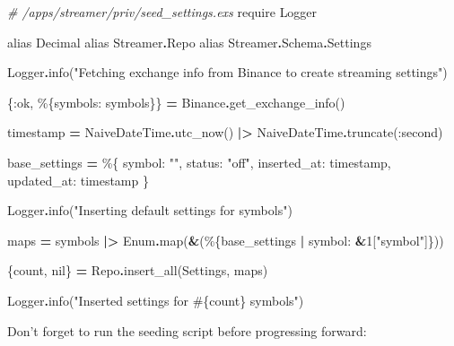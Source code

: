 \documentclass[
  oneside]{book}
\newenvironment{Shaded}{\begin{snugshade}}{\end{snugshade}}
\newcommand{\CommentTok}[1]{\textcolor[rgb]{0.56,0.35,0.01}{\textit{#1}}}
\newcommand{\ConstantTok}[1]{\textcolor[rgb]{0.00,0.00,0.00}{#1}}
\newcommand{\DecValTok}[1]{\textcolor[rgb]{0.00,0.00,0.81}{#1}}
\newcommand{\ImportTok}[1]{#1}
\newcommand{\NormalTok}[1]{#1}
\newcommand{\OperatorTok}[1]{\textcolor[rgb]{0.81,0.36,0.00}{\textbf{#1}}}
\newcommand{\OtherTok}[1]{\textcolor[rgb]{0.56,0.35,0.01}{#1}}
\newcommand{\StringTok}[1]{\textcolor[rgb]{0.31,0.60,0.02}{#1}}
\newcommand{\VariableTok}[1]{\textcolor[rgb]{0.00,0.00,0.00}{#1}}
\begin{document}
\begin{Shaded}
\begin{Highlighting}[]
\CommentTok{\# /apps/streamer/priv/seed\_settings.exs}
\ImportTok{require} \ConstantTok{Logger}

\ImportTok{alias} \ConstantTok{Decimal}
\ImportTok{alias} \ConstantTok{Streamer}\OperatorTok{.}\ConstantTok{Repo}
\ImportTok{alias} \ConstantTok{Streamer}\OperatorTok{.}\ConstantTok{Schema}\OperatorTok{.}\ConstantTok{Settings}

\ConstantTok{Logger}\OperatorTok{.}\NormalTok{info(}\StringTok{"Fetching exchange info from Binance to create streaming settings"}\NormalTok{)}

\NormalTok{\{}\VariableTok{:ok}\NormalTok{, \%\{}\VariableTok{symbols:}\NormalTok{ symbols\}\} }\OperatorTok{=} \ConstantTok{Binance}\OperatorTok{.}\NormalTok{get\_exchange\_info()}

\NormalTok{timestamp }\OperatorTok{=} \ConstantTok{NaiveDateTime}\OperatorTok{.}\NormalTok{utc\_now()}
  \OperatorTok{|\textgreater{}} \ConstantTok{NaiveDateTime}\OperatorTok{.}\NormalTok{truncate(}\VariableTok{:second}\NormalTok{)}

\NormalTok{base\_settings }\OperatorTok{=}\NormalTok{ \%\{}
  \VariableTok{symbol:} \StringTok{""}\NormalTok{,}
  \VariableTok{status:} \StringTok{"off"}\NormalTok{,}
  \VariableTok{inserted\_at:}\NormalTok{ timestamp,}
  \VariableTok{updated\_at:}\NormalTok{ timestamp}
\NormalTok{\}}

\ConstantTok{Logger}\OperatorTok{.}\NormalTok{info(}\StringTok{"Inserting default settings for symbols"}\NormalTok{)}

\NormalTok{maps }\OperatorTok{=}\NormalTok{ symbols}
  \OperatorTok{|\textgreater{}} \ConstantTok{Enum}\OperatorTok{.}\NormalTok{map(}\OperatorTok{\&}\NormalTok{(\%\{base\_settings }\OperatorTok{|} \VariableTok{symbol:} \OperatorTok{\&}\DecValTok{1}\NormalTok{[}\StringTok{"symbol"}\NormalTok{]\}))}

\NormalTok{\{count, }\ConstantTok{nil}\NormalTok{\} }\OperatorTok{=} \ConstantTok{Repo}\OperatorTok{.}\NormalTok{insert\_all(}\ConstantTok{Settings}\NormalTok{, maps)}

\ConstantTok{Logger}\OperatorTok{.}\NormalTok{info(}\StringTok{"Inserted settings for }\OtherTok{\#\{}\NormalTok{count}\OtherTok{\}}\StringTok{ symbols"}\NormalTok{)}
\end{Highlighting}
\end{Shaded}

Don't forget to run the seeding script before progressing forward:
\end{document}
